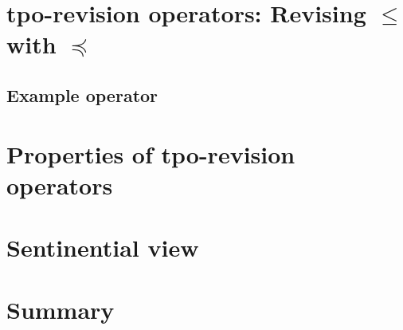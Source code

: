 \documentclass[11pt]{scrartcl}
\theoremstyle{definition}
\begin{document}
\section{tpo-revision operators: Revising $\leq$ with $\preceq$}
\subsection{Example operator}

\section{Properties of tpo-revision operators}

\section{Sentinential view}

\section{Summary}
\end{document}
